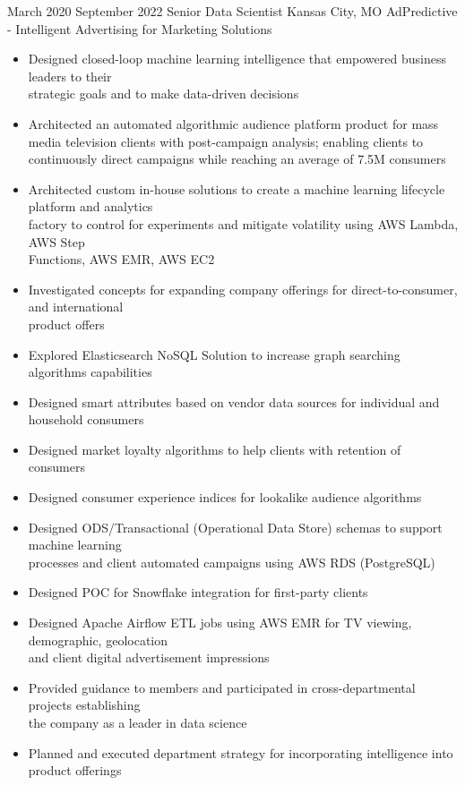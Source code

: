 
\ProjectExperience
{March 2020}
{September 2022}
{Senior Data Scientist}
{Kansas City, MO}
{AdPredictive - Intelligent Advertising for Marketing Solutions}
{\begin{itemize}
    \item Designed closed-loop machine learning intelligence that empowered business leaders to
    their \\strategic goals and to make data-driven decisions
    \item Architected an automated algorithmic audience platform product for mass media
    television clients with post-campaign analysis; enabling clients to continuously direct
    campaigns while reaching an average of 7.5M consumers
    \item Architected custom in-house solutions to create a machine learning lifecycle platform
    and analytics \\factory to control for experiments and mitigate volatility using AWS Lambda, AWS
    Step \\Functions, AWS EMR, AWS EC2
\end{itemize}}
{\begin{itemize}
    \item Investigated concepts for expanding company offerings for direct-to-consumer, and
    international \\product offers
    \item Explored Elasticsearch NoSQL Solution to increase graph searching algorithms
    capabilities
    \item Designed smart attributes based on vendor data sources for individual and household
    consumers
    \item Designed market loyalty algorithms to help clients with retention of consumers
    \item Designed consumer experience indices for lookalike audience algorithms
    \item Designed ODS/Transactional (Operational Data Store) schemas to support machine learning
    \\processes and client automated campaigns using AWS RDS (PostgreSQL)
    \item Designed POC for Snowflake integration for first-party clients
    \item Designed Apache Airflow ETL jobs using AWS EMR for TV viewing, demographic, geolocation
    \\and client digital advertisement impressions
\end{itemize}}
{\begin{itemize}
    \item Provided guidance to members and participated in cross-departmental projects
    establishing \\the company as a leader in data science
    \item Planned and executed department strategy for incorporating intelligence into product
    offerings
\end{itemize}}